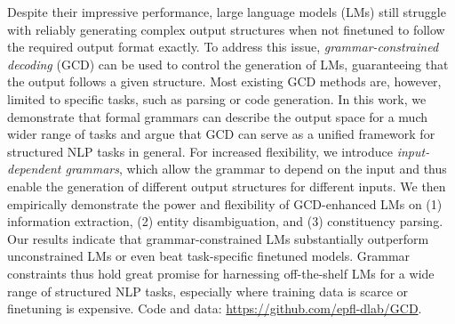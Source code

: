 Despite their impressive performance, large language models (LMs) still struggle with reliably generating complex output structures when not finetuned to follow the required output format exactly.
To address this issue, \textit{grammar-constrained decoding} (GCD) can be used to control the generation of LMs, guaranteeing that the output follows a given structure.
Most existing GCD methods are, however, limited to specific tasks, such as parsing or code generation.
In this work, we demonstrate that formal grammars can describe the output space for a much wider range of tasks and argue that GCD can serve as a unified framework for structured NLP tasks in general.
For increased flexibility, we introduce \textit{input-dependent grammars}, which allow the grammar to depend on the input and thus enable the generation of different output structures for different inputs.
We then empirically demonstrate the power and flexibility of GCD-enhanced LMs on (1) information extraction, (2) entity disambiguation, and (3) constituency parsing.
Our results indicate that grammar-constrained LMs substantially outperform unconstrained LMs or even beat task-specific finetuned models.
Grammar constraints thus hold great promise for harnessing off-the-shelf LMs for a wide range of structured NLP tasks, especially where training data is scarce or finetuning is expensive.
Code and data: \url{https://github.com/epfl-dlab/GCD}.